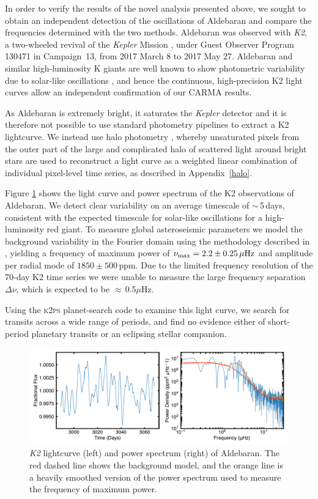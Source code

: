 \documentclass[modern]{aastex61}
\newcommand{\numax}{\mbox{$\nu_{\rm max}$}\xspace}
\newcommand{\Dnu}{\mbox{$\Delta \nu$}\xspace}
\newcommand{\muHz}{\mbox{$\mu$Hz}\xspace}
\newcommand{\kepler}{\emph{Kepler}\xspace}
\newcommand{\ktwo}{\emph{K2}\xspace}
\begin{document}
In order to verify the results of the novel analysis presented above, we sought to obtain an independent detection of the oscillations of Aldebaran and compare the frequencies determined with the two methods.
Aldebaran was observed with \ktwo \citep{howell14}, a two-wheeled revival of the \kepler Mission \citep{2010sci...327..977b}, under Guest Observer Program 130471 in Campaign~13, from 2017 March 8 to 2017 May 27. Aldebaran and similar high-luminosity K giants are well known to show photometric variability due to solar-like oscillations \citep{bedding2000}, and hence the continuous, high-precision K2 light curves allow an independent confirmation of our CARMA results.

As Aldebaran is extremely bright, it saturates the \kepler detector and it is therefore not possible to use standard photometry pipelines to extract a K2 lightcurve. We instead use halo photometry \citep{White2017}, whereby unsaturated pixels from the outer part of the large and complicated halo of scattered light around bright stars are used to reconstruct a light curve as a weighted linear combination of individual pixel-level time series, as described in Appendix~\ref{halo}.

Figure \ref{k2_lightcurve} shows the light curve and power spectrum of the K2 observations of Aldebaran. We detect clear variability on an average timescale of $\sim$\,5\,days, consistent with the expected timescale for solar-like oscillations for a high-luminosity red giant. To measure global asteroseismic parameters we model the background variability in the Fourier domain using the methodology described in \citet{huber09}, yielding a frequency of maximum power of $\numax = 2.2 \pm 0.25\,\muHz$ and amplitude per radial mode of $1850 \pm 500$\,ppm. Due to the limited frequency resolution of the 70-day K2 time series we were unable to measure the large frequency separation \Dnu, which is expected to be $\approx$\,0.5\muHz.

Using the \textsc{k2ps} planet-search code \citep{k2ps,Pope2016} to examine this light curve, we search for transits across a wide range of periods, and find no evidence either of short-period planetary transits or an eclipsing stellar companion.

\begin{figure}
\centering
\includegraphics[width=\textwidth]{k2obs}
\caption{\ktwo lightcurve (left) and power spectrum (right) of Aldebaran. The red dashed line shows the background model, and the orange line is a heavily smoothed version of the power spectrum used to measure the frequency of maximum power. }
\label{k2_lightcurve}
\end{figure}
\end{document}
